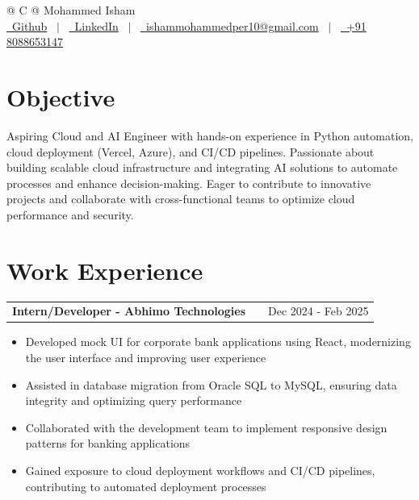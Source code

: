 \documentclass[a4paper,12pt]{article}
\makeatletter
\newenvironment{joblong}[2]
    {
    \begin{tabularx}{\linewidth}{@{}l X r@{}}
    \textbf{#1} & \hfill &  #2 \\[3.75pt]
    \end{tabularx}
    \begin{minipage}[t]{\linewidth}
    \begin{itemize}[nosep,after=\strut, leftmargin=1em, itemsep=3pt,label=--]
    }
    {
    \end{itemize}
    \end{minipage}
    }
\makeatother
\begin{document}
\pagestyle{empty}


\begin{tabularx}{\linewidth}{@{} C @{}}
\Huge{Mohammed Isham} \\[5pt]
\href{https://github.com/Dexterisham}{\raisebox{-0.05\height}\faGithub\ Github} \ $|$ \
\href{https://www.linkedin.com/in/mohammed-isham-6b6274208}{\raisebox{-0.05\height}\faLinkedin\ LinkedIn} \ $|$ \
\href{mailto:ishammohammedper10@gmail.com}{\raisebox{-0.05\height}\faEnvelope \ ishammohammedper10@gmail.com} \ $|$ \
\href{tel:+918088653147}{\raisebox{-0.05\height}\faMobile \ +91 8088653147} \\
\end{tabularx}

\section{Objective}
Aspiring Cloud and AI Engineer with hands-on experience in Python automation, cloud deployment (Vercel, Azure), and CI/CD pipelines. Passionate about building scalable cloud infrastructure and integrating AI solutions to automate processes and enhance decision-making. Eager to contribute to innovative projects and collaborate with cross-functional teams to optimize cloud performance and security.

\section{Work Experience}

\begin{joblong}{Intern/Developer - Abhimo Technologies}{Dec 2024 - Feb 2025}
\item Developed mock UI for corporate bank applications using React, modernizing the user interface and improving user experience
\item Assisted in database migration from Oracle SQL to MySQL, ensuring data integrity and optimizing query performance
\item Collaborated with the development team to implement responsive design patterns for banking applications
\item Gained exposure to cloud deployment workflows and CI/CD pipelines, contributing to automated deployment processes
\end{joblong}
\end{document}
